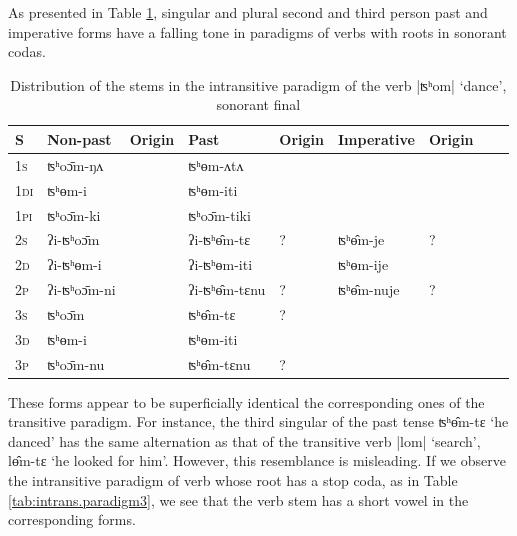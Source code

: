 \documentclass[oldfontcommands,oneside,a4paper,11pt]{article}
\newcommand{\ipa}[1]{{\phon \mbox{#1}}} %
\begin{document}
As presented in Table \ref{tab:intrans.paradigm2}, singular and plural second and third person past and imperative forms have a falling tone in paradigms of verbs with roots in sonorant codas.

\begin{table}[h]
\caption{Distribution of the stems in the intransitive paradigm of the verb |ʦʰom| `dance', sonorant final} \label{tab:intrans.paradigm2} \centering
\begin{tabular}{lllllllll}
\toprule
S & Non-past & Origin & Past & Origin & Imperative & Origin \\
\midrule
\textsc{1s} & \ipa{ʦʰoɔ̄m-ŋʌ} & & \ipa{ʦʰɵm-ʌtʌ} &\\
\textsc{1di} & \ipa{ʦʰɵm-i} && \ipa{ʦʰɵm-iti}& \\
\textsc{1pi} & \ipa{ʦʰoɔ̄m-ki} && \ipa{ʦʰoɔ̄m-tiki} &&\\
\textsc{2s} & \ipa{ʔi-ʦʰoɔ̄m} & &\ipa{ʔi-ʦʰɵ̂m-tɛ}  &?&\ipa{ʦʰɵ̂m-je}&?\\
\textsc{2d} & \ipa{ʔi-ʦʰɵm-i}  & &\ipa{ʔi-ʦʰɵm-iti} &&\ipa{ʦʰɵm-ije} &\\
\textsc{2p} & \ipa{ʔi-ʦʰoɔ̄m-ni} && \ipa{ʔi-ʦʰɵ̂m-tɛnu} &?&\ipa{ʦʰɵ̂m-nuje}&?\\
\textsc{3s} & \ipa{ʦʰoɔ̄m} & &\ipa{ʦʰɵ̂m-tɛ} &?\\
\textsc{3d} & \ipa{ʦʰɵm-i} & &\ipa{ʦʰɵm-iti} &\\
\textsc{3p} & \ipa{ʦʰoɔ̄m-nu} && \ipa{ʦʰɵ̂m-tɛnu} &?\\
\bottomrule
\end{tabular}
\end{table}

These forms appear to be superficially identical the corresponding ones of the transitive paradigm. For instance, the third singular of the past tense \ipa{ʦʰɵ̂m-tɛ} `he danced' has the same alternation as that of the transitive verb |lom| `search', \ipa{lɵ̂m-tɛ} `he looked for him'. However, this resemblance is misleading. If we observe the intransitive paradigm of verb whose root has a stop coda, as in Table \ref{tab:intrans.paradigm3}, we see that the verb stem has a short vowel in the corresponding forms.
\end{document}
